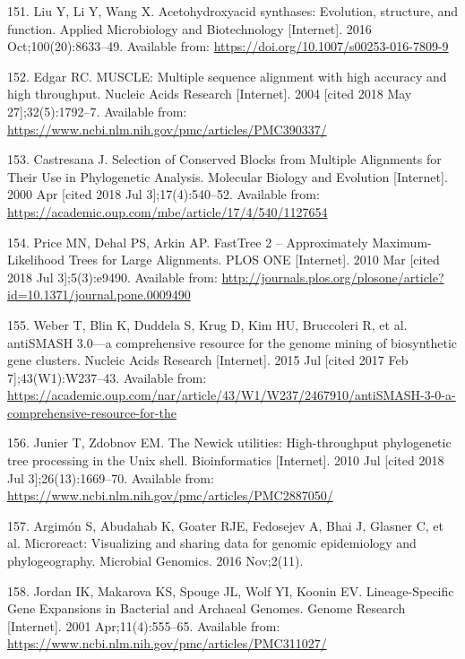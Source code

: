 \documentclass[12pt,twoside]{reedthesis}
\begin{document}
  \hypertarget{ref-liu_acetohydroxyacid_2016}{}
  151. Liu Y, Li Y, Wang X. Acetohydroxyacid synthases: Evolution,
  structure, and function. Applied Microbiology and Biotechnology
  {[}Internet{]}. 2016 Oct;100(20):8633--49. Available from:
  \url{https://doi.org/10.1007/s00253-016-7809-9}
  
  \hypertarget{ref-edgar_muscle_2004}{}
  152. Edgar RC. MUSCLE: Multiple sequence alignment with high accuracy
  and high throughput. Nucleic Acids Research {[}Internet{]}. 2004
  {[}cited 2018 May 27{]};32(5):1792--7. Available from:
  \url{https://www.ncbi.nlm.nih.gov/pmc/articles/PMC390337/}
  
  \hypertarget{ref-castresana_selection_2000}{}
  153. Castresana J. Selection of Conserved Blocks from Multiple
  Alignments for Their Use in Phylogenetic Analysis. Molecular Biology and
  Evolution {[}Internet{]}. 2000 Apr {[}cited 2018 Jul 3{]};17(4):540--52.
  Available from:
  \url{https://academic.oup.com/mbe/article/17/4/540/1127654}
  
  \hypertarget{ref-price_fasttree_2010}{}
  154. Price MN, Dehal PS, Arkin AP. FastTree 2 -- Approximately
  Maximum-Likelihood Trees for Large Alignments. PLOS ONE {[}Internet{]}.
  2010 Mar {[}cited 2018 Jul 3{]};5(3):e9490. Available from:
  \url{http://journals.plos.org/plosone/article?id=10.1371/journal.pone.0009490}
  
  \hypertarget{ref-weber_antismash3_2015}{}
  155. Weber T, Blin K, Duddela S, Krug D, Kim HU, Bruccoleri R, et al.
  antiSMASH 3.0---a comprehensive resource for the genome mining of
  biosynthetic gene clusters. Nucleic Acids Research {[}Internet{]}. 2015
  Jul {[}cited 2017 Feb 7{]};43(W1):W237--43. Available from:
  \url{https://academic.oup.com/nar/article/43/W1/W237/2467910/antiSMASH-3-0-a-comprehensive-resource-for-the}
  
  \hypertarget{ref-junier_newick_2010}{}
  156. Junier T, Zdobnov EM. The Newick utilities: High-throughput
  phylogenetic tree processing in the Unix shell. Bioinformatics
  {[}Internet{]}. 2010 Jul {[}cited 2018 Jul 3{]};26(13):1669--70.
  Available from:
  \url{https://www.ncbi.nlm.nih.gov/pmc/articles/PMC2887050/}
  
  \hypertarget{ref-argimon_microreact_2016}{}
  157. Argimón S, Abudahab K, Goater RJE, Fedosejev A, Bhai J, Glasner C,
  et al. Microreact: Visualizing and sharing data for genomic epidemiology
  and phylogeography. Microbial Genomics. 2016 Nov;2(11).
  
  \hypertarget{ref-jordan_lineage-specific_2001}{}
  158. Jordan IK, Makarova KS, Spouge JL, Wolf YI, Koonin EV.
  Lineage-Specific Gene Expansions in Bacterial and Archaeal Genomes.
  Genome Research {[}Internet{]}. 2001 Apr;11(4):555--65. Available from:
  \url{https://www.ncbi.nlm.nih.gov/pmc/articles/PMC311027/}
  
\end{document}
